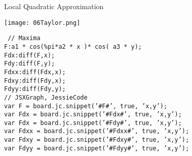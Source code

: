 \begin{frame} [t]{Local Quadratic Approximation}
\begin{minipage}[t]{12cm}
\begin{center}
\texttt{[image: 06Taylor.png]}
\end{center}
\end{minipage}\hfill
\begin{minipage}[b]{17cm}
\texttt{%
// Maxima\\
F:a1 * cos(\%pi*a2 * x )* cos( a3 * y);\\
Fdx:diff(F,x);\\
Fdy:diff(F,y);\\
Fdxx:diff(Fdx,x);\\
Fdxy:diff(Fdy,x);\\
Fdyy:diff(Fdy,y);\\
%
// JSXGraph, JessieCode\\
var F =  board.jc.snippet('{\#F\#}', true, 'x,y');\\
var Fdx =  board.jc.snippet('{\#Fdx\#}', true, 'x,y');\\
var Fdx =  board.jc.snippet('{\#Fdy\#}', true, 'x,y');\\
var Fdxx =  board.jc.snippet('{\#Fdxx\#}', true, 'x,y');\\
var Fdxy =  board.jc.snippet('{\#Fdxy\#}', true, 'x,y');\\
var Fdyy =  board.jc.snippet('{\#Fdyy\#}', true, 'x,y');\\
}
\end{minipage}
\end{frame}

